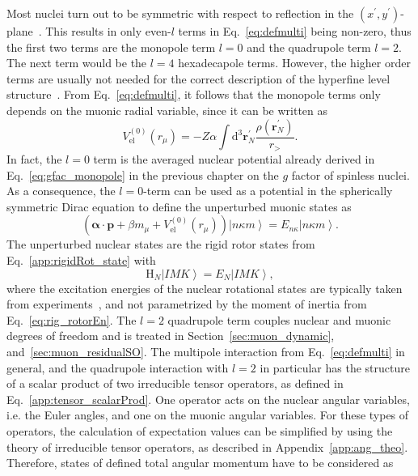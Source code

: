 Most nuclei turn out to be symmetric with respect to reflection in the $(x^\prime ,y^\prime)$-plane~\cite{zickendraht1991}. This results in only even-$l$ terms in Eq.~\eqref{eq:defmulti} being non-zero, thus the first two terms are the monopole term $l=0$ and the quadrupole term $l=2$. The next term would be the $l=4$ hexadecapole terms. However, the higher order terms are usually not needed for the correct description of the hyperfine level structure~\cite{BorieRinker1982}. From Eq.~\eqref{eq:defmulti}, it follows that the monopole terms only depends on the muonic radial variable, since it can be written as
\begin{equation}
V_{\text{el}}^{(0)}(r_\mu)=-Z\alpha \int\text{d}^3\mathbf{r}_N^\prime \frac{\rho(\mathbf{r}_N^\prime)}{r_>}.
\end{equation}
In fact, the $l=0$ term is the averaged nuclear potential already derived in Eq.~\eqref{eq:gfac_monopole} in the previous chapter on the $g$ factor of spinless nuclei. As a consequence, the $l=0$-term can be used as a potential in the spherically symmetric Dirac equation to define the unperturbed muonic states as
\begin{equation}
\label{eq:muonicEn}
\left(\boldsymbol{\alpha} \cdot \mathbf{p} + \beta m_\mu + V_{\text{el}}^{(0)}(r_\mu) \right) \left|n\kappa m\right> = E_{n\kappa}\left|n\kappa m\right>.
\end{equation}
The unperturbed nuclear states are the rigid rotor states from Eq.~\eqref{app:rigidRot_state} with
\begin{equation}
\label{eq:nuclEn}
\text{H}_N \left|IMK\right> = E_N \left|IMK\right>,
\end{equation}
where the excitation energies of the nuclear rotational states are typically taken from experiments~\cite{ENSDF}, and not parametrized by the moment of inertia from Eq.~\eqref{eq:rig_rotorEn}.
The $l=2$ quadrupole term couples nuclear and muonic degrees of freedom and is treated in Section~\ref{sec:muon_dynamic}, and~\ref{sec:muon_residualSO}. The multipole interaction from Eq.~\eqref{eq:defmulti} in general, and the quadrupole interaction with $l=2$ in particular has the structure of a scalar product of two irreducible tensor operators, as defined in Eq.~\eqref{app:tensor_scalarProd}. One operator acts on the nuclear angular variables, i.e. the Euler angles, and one on the muonic angular variables.
For these types of operators, the calculation of expectation values can be simplified by using the theory of irreducible tensor operators, as described in Appendix~\ref{app:ang_theo}. Therefore, states of defined total angular momentum have to be considered as

